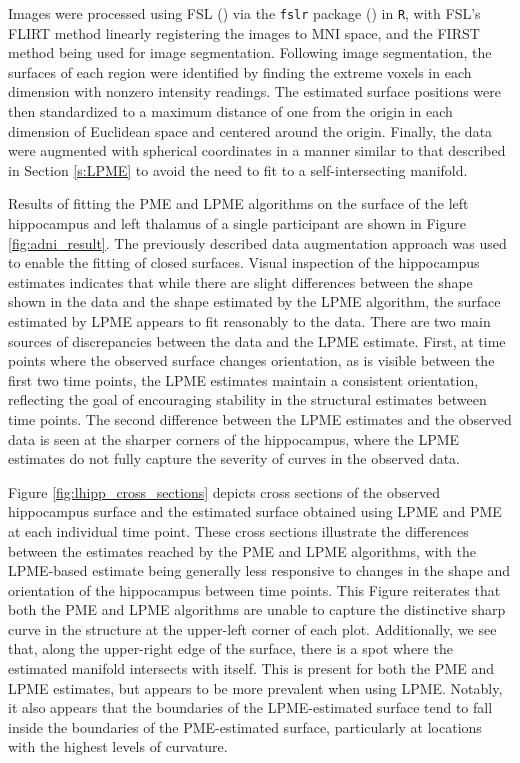 \documentclass[12pt]{article}
\theoremstyle{definition}
\begin{document}
Images were processed using FSL (\cite{jenkinsonFSL2012}) via the \texttt{fslr} package (\cite{muschelliFslrConnectingFSL2015}) in \texttt{R}, with FSL's FLIRT method linearly registering the images to MNI space, and the FIRST method being used for image segmentation. Following image segmentation, the surfaces of each region were identified by finding the extreme voxels in each dimension with nonzero intensity readings. The estimated surface positions were then standardized to a maximum distance of one from the origin in each dimension of Euclidean space and centered around the origin. Finally, the data were augmented with spherical coordinates in a manner similar to that described in Section \ref{s:LPME} to avoid the need to fit to a self-intersecting manifold.

Results of fitting the PME and LPME algorithms on the surface of the left hippocampus and left thalamus of a single participant are shown in Figure \ref{fig:adni_result}. The previously described data augmentation approach was used to enable the fitting of closed surfaces. Visual inspection of the hippocampus estimates indicates that while there are slight differences between the shape shown in the data and the shape estimated by the LPME algorithm, the surface estimated by LPME appears to fit reasonably to the data. There are two main sources of discrepancies between the data and the LPME estimate. First, at time points where the observed surface changes orientation, as is visible between the first two time points, the LPME estimates maintain a consistent orientation, reflecting the goal of encouraging stability in the structural estimates between time points. The second difference between the LPME estimates and the observed data is seen at the sharper corners of the hippocampus, where the LPME estimates do not fully capture the severity of curves in the observed data.

Figure \ref{fig:lhipp_cross_sections} depicts cross sections of the observed hippocampus surface and the estimated surface obtained using LPME and PME at each individual time point. These cross sections illustrate the differences between the estimates reached by the PME and LPME algorithms, with the LPME-based estimate being generally less responsive to changes in the shape and orientation of the hippocampus between time points. This Figure reiterates that both the PME and LPME algorithms are unable to capture the distinctive sharp curve in the structure at the upper-left corner of each plot. Additionally, we see that, along the upper-right edge of the surface, there is a spot where the estimated manifold intersects with itself. This is present for both the PME and LPME estimates, but appears to be more prevalent when using LPME. Notably, it also appears that the boundaries of the LPME-estimated surface tend to fall inside the boundaries of the PME-estimated surface, particularly at locations with the highest levels of curvature.
\end{document}
